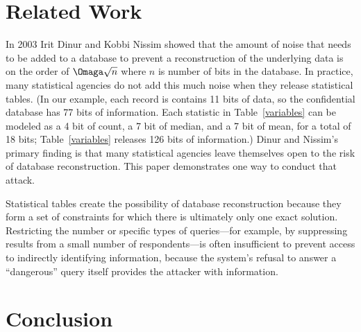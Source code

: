 \documentclass[runningheads]{llncs}
\begin{document}
\section{Related Work}

In 2003 Irit Dinur and Kobbi Nissim\cite{DinurNissim2003} showed that
the amount of noise that needs to be added to a database to prevent a
reconstruction of the underlying data is on the order of $\Omaga\sqrt{n}$
where $n$ is number of bits in the database. In practice, many statistical
agencies do not add this much noise when they release
statistical tables. (In our example, each
record is contains 11 bits of data, so the confidential database has
77 bits of information. Each statistic in Table~\ref{variables}
can be modeled as a 4 bit of count, a 7 bit of median, and a 7 bit of
mean, for a total of 18 bits; Table~\ref{variables} releases 126 bits
of information.) Dinur and Nissim's primary finding
is that many statistical agencies leave themselves open to the risk of
database reconstruction. This paper demonstrates one way to
conduct that attack.

Statistical tables create the possibility of database reconstruction
because they form a set of constraints for which there is ultimately
only one exact solution. Restricting the number or specific types of
queries---for example, by suppressing results from a small number of
respondents---is often insufficient to prevent access to indirectly
identifying information, because the system's refusal to answer a
``dangerous'' query itself provides the attacker with information.



\section{Conclusion}
\end{document}
